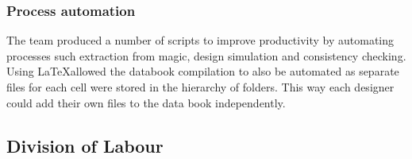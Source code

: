 \subsubsection{Process automation}
The team produced a number of scripts to improve productivity by automating processes such extraction from magic, design simulation and consistency checking.
Using \LaTeX allowed the databook compilation to also be automated as separate files for each cell were stored in the hierarchy of folders.   
This way each designer could add their own files to the data book independently.



\clearpage
\subsection{Division of Labour}
